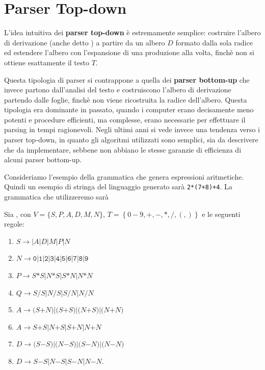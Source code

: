 \section{Parser Top-down}\label{sec:parser-top-down}

L'idea intuitiva dei \textbf{parser top-down} è estremamente semplice: costruire l'albero di derivazione (anche detto
) a partire da un albero $D$ formato dalla
sola radice ed estendere l'albero con l'espansione di una produzione alla volta, finchè non si ottiene esattamente il
testo $T$.

Questa tipologia di parser si contrappone a quella dei \textbf{parser bottom-up} che invece partono dall'analisi del
testo e costruiscono l'albero di derivazione partendo dalle foglie, finchè non viene ricostruita la radice dell'albero.
Questa tipologia era dominante in passato, quando i computer erano decisamente meno potenti e procedure efficienti, ma
complesse, erano necessarie per effettuare il parsing in tempi ragionevoli.
Negli ultimi anni si vede invece una tendenza verso i parser top-down, in quanto gli algoritmi utilizzati sono semplici,
sia da descrivere che da implementare, sebbene non abbiano le stesse garanzie di efficienza di alcuni parser bottom-up.

Consideriamo l'esempio della grammatica che genera espressioni aritmetiche.
Quindi un esempio di stringa del linguaggio generato sarà \verb/2*(7+8)+4/.
La grammatica che utilizzeremo sarà
\begin{example}\label{exa:parse-espressioni}
Sia \gramm, con $V=\{S,P, A, D, M, N\}$, $T=\left\{ 0-9, +, -, *, /, (,)\right\}$ e le seguenti regole:
\begin{enumerate}
\item $S\to  | A | D | M | P | N$
\item $N\to \mathtt{0}|\mathtt{1}|\mathtt{2}|\mathtt{3}|\mathtt{4}|\mathtt{5}|\mathtt{6}|\mathtt{7}|\mathtt{8}|\mathtt{9}$
\item $P\to S \mathtt{*} S | N \mathtt{*} S | S \mathtt{*} N | N \mathtt{*} N $
\item $Q\to S \mathtt{/} S| N \mathtt{/} S| S \mathtt{/} N| N \mathtt{/} N$
\item $A\to \mathtt{(}S \mathtt{+} N)\mathtt{} |\mathtt{(}S \mathtt{+} S)\mathtt{} |\mathtt{(}N \mathtt{+} S)\mathtt{} |\mathtt{(}N \mathtt{+} N)\mathtt{}$
\item $A\to S \mathtt{+} S | N \mathtt{+} S |S \mathtt{+} N |N \mathtt{+} N $
\item $D\to \mathtt{(}S \mathtt{-} S)\mathtt{} |\mathtt{(}N \mathtt{-} S)\mathtt{} |\mathtt{(}S \mathtt{-} N)\mathtt{} |\mathtt{(}N \mathtt{-} N)\mathtt{}$
\item $D\to S \mathtt{-} S | N \mathtt{-} S |S \mathtt{-} N |N \mathtt{-} N $.
\end{enumerate}
\end{example}

